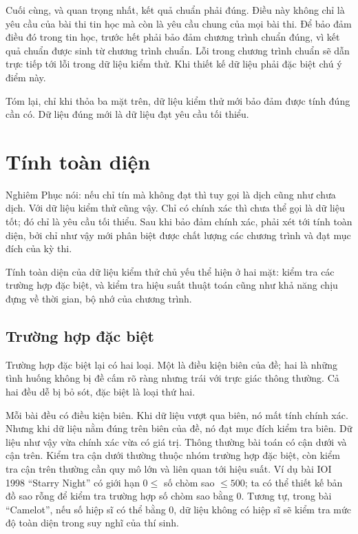 \documentclass[11pt]{article}
\begin{document}
Cuối cùng, và quan trọng nhất, kết quả chuẩn phải đúng. Điều này không chỉ là
yêu cầu của bài thi tin học mà còn là yêu cầu chung của mọi bài thi. Để bảo
đảm điều đó trong tin học, trước hết phải bảo đảm chương trình chuẩn đúng, vì
kết quả chuẩn được sinh từ chương trình chuẩn. Lỗi trong chương trình chuẩn sẽ
dẫn trực tiếp tới lỗi trong dữ liệu kiểm thử. Khi thiết kế dữ liệu phải đặc
biệt chú ý điểm này.

Tóm lại, chỉ khi thỏa ba mặt trên, dữ liệu kiểm thử mới bảo đảm được tính đúng
cần có. Dữ liệu đúng mới là dữ liệu đạt yêu cầu tối thiểu.

\section{Tính toàn diện}

Nghiêm Phục nói: nếu chỉ tín mà không đạt thì tuy gọi là dịch cũng như chưa
dịch. Với dữ liệu kiểm thử cũng vậy. Chỉ có chính xác thì chưa thể gọi là dữ
liệu tốt; đó chỉ là yêu cầu tối thiểu. Sau khi bảo đảm chính xác, phải xét tới
tính toàn diện, bởi chỉ như vậy mới phân biệt được chất lượng các chương trình
và đạt mục đích của kỳ thi.

Tính toàn diện của dữ liệu kiểm thử chủ yếu thể hiện ở hai mặt: kiểm tra các
trường hợp đặc biệt, và kiểm tra hiệu suất thuật toán cũng như khả năng chịu
đựng về thời gian, bộ nhớ của chương trình.

\subsection{Trường hợp đặc biệt}

Trường hợp đặc biệt lại có hai loại. Một là điều kiện biên của đề; hai là
những tình huống không bị đề cấm rõ ràng nhưng trái với trực giác thông
thường. Cả hai đều dễ bị bỏ sót, đặc biệt là loại thứ hai.

Mỗi bài đều có điều kiện biên. Khi dữ liệu vượt qua biên, nó mất tính chính
xác. Nhưng khi dữ liệu nằm đúng trên biên của đề, nó đạt mục đích kiểm tra
biên. Dữ liệu như vậy vừa chính xác vừa có giá trị. Thông thường bài toán có
cận dưới và cận trên. Kiểm tra cận dưới thường thuộc nhóm trường hợp đặc biệt,
còn kiểm tra cận trên thường cần quy mô lớn và liên quan tới hiệu suất. Ví dụ
bài IOI 1998 ``Starry Night'' có giới hạn $0\le$ số chòm sao $\le 500$; ta có
thể thiết kế bản đồ sao rỗng để kiểm tra trường hợp số chòm sao bằng $0$.
Tương tự, trong bài ``Camelot'', nếu số hiệp sĩ có thể bằng $0$, dữ liệu không
có hiệp sĩ sẽ kiểm tra mức độ toàn diện trong suy nghĩ của thí sinh.
\end{document}
